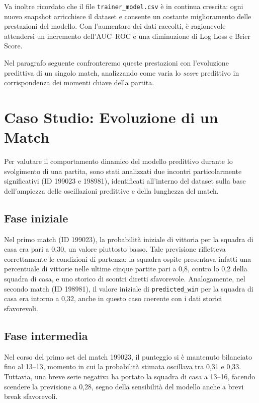 \documentclass[a4paper,12pt]{report}
\begin{document}
\medskip

\noindent Va inoltre ricordato che il file \texttt{trainer\_model.csv} è in continua crescita: ogni nuovo snapshot arricchisce il dataset e consente un costante miglioramento delle prestazioni del modello. Con l’aumentare dei dati raccolti, è ragionevole attendersi un incremento dell’AUC–ROC e una diminuzione di Log Loss e Brier Score.

\medskip

\noindent Nel paragrafo seguente confronteremo queste prestazioni con l’evoluzione predittiva di un singolo match, analizzando come varia lo \textit{score} predittivo in corrispondenza dei momenti chiave della partita.



\section{ Caso Studio: Evoluzione di un Match}


Per valutare il comportamento dinamico del modello predittivo durante lo svolgimento di una partita, sono stati analizzati due incontri particolarmente significativi (ID 199023 e 198981), identificati all’interno del dataset sulla base dell’ampiezza delle oscillazioni predittive e della lunghezza del match.

\subsection*{Fase iniziale}

Nel primo match (ID 199023), la probabilità iniziale di vittoria per la squadra di casa era pari a 0{,}30, un valore piuttosto basso. Tale previsione rifletteva correttamente le condizioni di partenza: la squadra ospite presentava infatti una percentuale di vittorie nelle ultime cinque partite pari a 0{,}8, contro lo 0{,}2 della squadra di casa, e uno storico di scontri diretti sfavorevole. Analogamente, nel secondo match (ID 198981), il valore iniziale di \texttt{predicted\_win} per la squadra di casa era intorno a 0{,}32, anche in questo caso coerente con i dati storici sfavorevoli.

\subsection*{Fase intermedia}

Nel corso del primo set del match 199023, il punteggio si è mantenuto bilanciato fino al 13–13, momento in cui la probabilità stimata oscillava tra 0{,}31 e 0{,}33. Tuttavia, una breve serie negativa ha portato la squadra di casa a 13–16, facendo scendere la previsione a 0{,}28, segno della sensibilità del modello anche a brevi break sfavorevoli.
\end{document}
